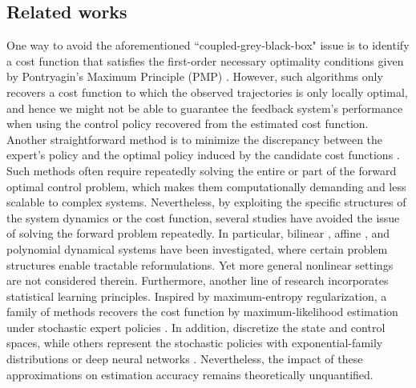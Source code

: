 \subsection{Related works}
One way to avoid the aforementioned ``coupled-grey-black-box" issue is to identify a cost function that satisfies the first-order necessary optimality conditions given by Pontryagin's Maximum Principle (PMP) \citep{Liang2023DataDriven}.
However, such algorithms only recovers a cost function to which the observed trajectories is only locally optimal, and hence we might not be able to guarantee the feedback system's performance when using the control policy recovered from the estimated cost function.
Another straightforward method is to minimize the discrepancy between the expert's policy and the optimal policy induced by the candidate cost functions \citep{abbeel2004apprenticeship, ziebart2008maximum, Ho2016GAIL}.
Such methods often require repeatedly solving the entire or part of the forward optimal control problem, which makes them computationally demanding and less scalable to complex systems.
Nevertheless, by exploiting the specific structures of the system dynamics or the cost function, several studies have avoided the issue of solving the forward problem repeatedly.
In particular, bilinear \citep{fernandez2025estimating}, affine \citep{lian2022inverse, Jean2019Injectivity, Rodrigues2022Inverse}, and polynomial dynamical systems \citep{pauwels2016linear} have been investigated, where certain problem structures enable tractable reformulations. Yet more general nonlinear settings are not considered therein.
Furthermore, another line of research incorporates statistical learning principles.
Inspired by maximum-entropy regularization, a family of methods recovers the cost function by maximum-likelihood estimation under stochastic expert policies \citep{ziebart2008maximum, dvijotham2010inverse, garrabe2025convex, Mehr2023Maximum, Guo2021Deep}.
In addition, \citep{ziebart2008maximum, zhou2018Infinite} discretize the state and control spaces, while others represent the stochastic policies with exponential-family distributions \citep{dvijotham2010inverse, garrabe2025convex, Mehr2023Maximum} or deep neural networks \citep{Guo2021Deep}.
Nevertheless, the impact of these approximations on estimation accuracy remains theoretically unquantified.

